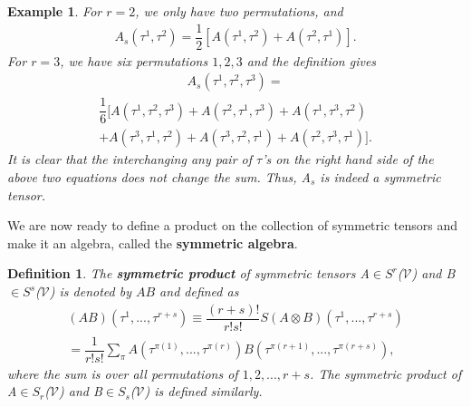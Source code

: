 \documentclass[12pt,a4paper]{article}
\newtheorem{defn}[thm]{Definition}
\newtheorem{exmp}{Example}[section]
\begin{document}
\begin{exmp}
For $r = 2$, we only have two permutations, and
 \begin{align*}
A_s(\tau^1,\tau^2) = \dfrac{1}{2} [A(\tau^1,\tau^2) + A(\tau^2,\tau^1)].
\end{align*}
For $r = 3$, we have six permutations $1, 2, 3$ and the definition gives
\begin{align*}
A_s(\tau^1,\tau^2,\tau^3) = 
\end{align*}
\begin{align*}
 \dfrac{1}{6}[A(\tau^1,\tau^2,\tau^3) + A(\tau^2,\tau^1,\tau^3) + A(\tau^1,\tau^3,\tau^2) \\+ A(\tau^3,\tau^1,\tau^2) + A(\tau^3,\tau^2,\tau^1) + A(\tau^2,\tau^3,\tau^1)].     
\end{align*}
It is clear that the interchanging any pair of $\tau$'s on the right hand side of the above  two equations does not change the sum. Thus, A$_s$ is indeed a symmetric tensor.
\end{exmp}
\hspace{1cm} We are now ready to define a product on the collection of symmetric tensors and make it an algebra, called the \textbf{symmetric algebra}.
\begin{defn}
The \textbf{symmetric product} of symmetric tensors A$\in S^r$($\mathcal{V}$) and B$\in S^s$($\mathcal{V}$) is denoted by $AB$ and defined as\\
\begin{align*}
(AB)(\tau^1,...,\tau^{r+s})\equiv \dfrac{(r+s)!}{r!s!}S(A\otimes B)(\tau^1,...,\tau^{r+s})\\
= \dfrac{1}{r!s!}\sum_{\pi}A(\tau^{\pi(1)},...,\tau^{\pi(r)})B(\tau^{\pi(r+1)},...,\tau^{\pi(r+s)}), 
\end{align*} 
where the sum is over all permutations of $1,2,...,r+s$. The symmetric product of A$\in S_{r}$($\mathcal{V}$) and B$\in S_{s}$($\mathcal{V}$) is defined similarly.
\end{defn}
\end{document}

